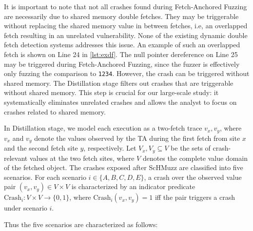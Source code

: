 \documentclass[conference]{IEEEtran}
\newcommand{\sysname}{ScHMuzz\xspace}
\newcommand{\stagetwo}{Fetch-Anchored Fuzzing\xspace}
\newcommand{\stagethree}{Distillation\xspace}
\begin{document}
It is important to note that not all crashes found during \stagetwo are necessarily 
due to shared memory double fetches. 
They may be triggerable without replacing the shared 
memory value in between fetches, i.e, an overlapped fetch resulting in an unrelated vulnerability. 
None of the existing dynamic double fetch detection systems addresses this issue.
An example of such an overlapped fetch is shown on Line 24 in \autoref{lst:exdf}. The null 
pointer dereference on Line 25 may be triggered during \stagetwo, since the fuzzer 
is effectively only fuzzing the comparison to \texttt{1234}.
However, the crash can be triggered without shared memory.
The \stagethree stage filters out crashes that are triggerable without shared memory.
This step is crucial for our large-scale study: it systematically eliminates unrelated 
crashes and allows the analyst to focus on crashes related to shared memory.

In \stagethree stage, we model each execution as a two-fetch trace \(v_x,v_y\), 
where $v_x$ and $v_y$ denote the values observed by the TA during the first fetch from site $x$ and the second fetch site $y$, respectively.
Let
\(V_x,V_y\subseteq V\) be the sets of crash-relevant values at the two
fetch sites, where $V$ denotes the complete value domain of the fetched object. 
The crashes exposed after \sysname are classified into
five scenarios.
For each scenario $i\in\{A,B,C,D,E\}$, a crash over the observed value pair $(v_x,v_y)\in V\times V$ is characterized by an indicator predicate $\mathrm{Crash}_i: V\times V\to\{0,1\}$, where $\mathrm{Crash}_i(v_x,v_y)=1$ iff the pair triggers a crash under scenario $i$.



Thus the five scenarios are characterized as follows:
\end{document}
